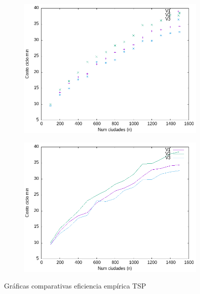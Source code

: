 \documentclass{article}
\begin{document}
\begin{figure}[H]
    \centering
    \begin{subfigure}[b]{0.45\textwidth}
        \centering
        \includegraphics[width=\textwidth]{Problema4/imagenes/TSP_calidad_points.png}
    \end{subfigure}
    \hfill
    \begin{subfigure}[b]{0.45\textwidth}
        \centering
        \includegraphics[width=\textwidth]{Problema4/imagenes/TSP_calidad_line.png}
    \end{subfigure}
    \caption{Gráficas comparativas eficiencia empírica TSP}
    \label{fig:cmp_opt}
\end{figure}
\end{document}
